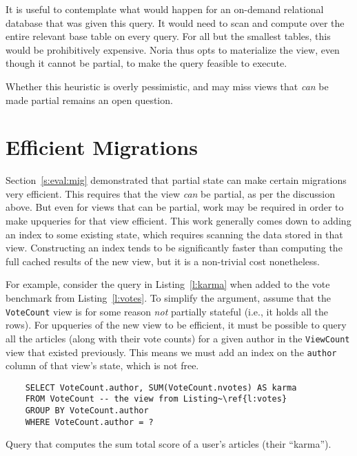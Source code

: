 It is useful to contemplate what would happen for an on-demand relational
database that was given this query. It would need to scan and compute over the
entire relevant base table on every query. For all but the smallest tables, this
would be prohibitively expensive. Noria thus opts to materialize the view, even
though it cannot be partial, to make the query feasible to execute.

Whether this heuristic is overly pessimistic, and may miss views that \emph{can}
be made partial remains an open question.

\section{Efficient Migrations}

Section~\ref{s:eval:mig} demonstrated that partial state can make certain
migrations very efficient. This requires that the view \emph{can} be partial, as
per the discussion above. But even for views that can be partial, work may be
required in order to make upqueries for that view efficient. This work generally
comes down to adding an index to some existing state, which requires scanning
the data stored in that view. Constructing an index tends to be significantly
faster than computing the full cached results of the new view, but it is a
non-trivial cost nonetheless.

For example, consider the query in Listing~\ref{l:karma} when added to the vote
benchmark from Listing~\ref{l:votes}. To simplify the argument, assume that the
\texttt{VoteCount} view is for some reason \emph{not} partially stateful (i.e.,
it holds all the rows). For upqueries of the new view to be efficient, it must
be possible to query all the articles (along with their vote counts) for a given
author in the \texttt{ViewCount} view that existed previously. This means we
must add an index on the \texttt{author} column of that view's state, which is
not free.

\begin{listing}[h]
  \begin{verbatim}
    SELECT VoteCount.author, SUM(VoteCount.nvotes) AS karma
    FROM VoteCount -- the view from Listing~\ref{l:votes}
    GROUP BY VoteCount.author
    WHERE VoteCount.author = ?
  \end{verbatim}
  \caption{Query that computes the sum total score of a user's articles
  (their ``karma'').}
  \label{l:scanning-votes}
\end{listing}

